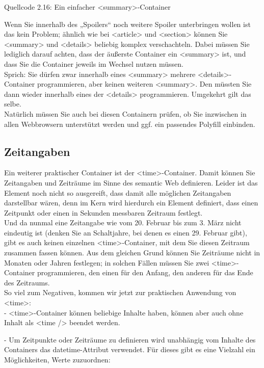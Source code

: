 Quellcode 2.16: Ein einfacher <summary>-Container

Wenn Sie innerhalb des „Spoilers“ noch weitere Spoiler unterbringen wollen ist das kein Problem; ähnlich wie bei <article> und <section> können Sie <summary> und <details> beliebig komplex verschachteln. Dabei müssen Sie lediglich darauf achten, dass der äußerste Container ein <summary> ist, und dass Sie die Container jeweils im Wechsel nutzen müssen.\\

Sprich: Sie dürfen zwar innerhalb eines <summary> mehrere <details>-Container programmieren, aber keinen weiteren <summary>. Den müssten Sie dann wieder innerhalb eines der <details> programmieren. Umgekehrt gilt das selbe.\\

Natürlich müssen Sie auch bei diesen Containern prüfen, ob Sie inzwischen in allen Webbrowsern unterstützt werden und ggf. ein passendes Polyfill einbinden.

\subsection{Zeitangaben}

Ein weiterer praktischer Container ist der <time>-Container. Damit können Sie Zeitangaben und Zeiträume im Sinne des semantic Web definieren. Leider ist das Element noch nicht so ausgereift, dass damit alle möglichen Zeitangaben darstellbar wären, denn im Kern wird hierdurch ein Element definiert, dass einen Zeitpunkt oder einen in Sekunden messbaren Zeitraum festlegt.\\

Und da nunmal eine Zeitangabe wie vom 20. Februar bis zum 3. März nicht eindeutig ist (denken Sie an Schaltjahre, bei denen es einen 29. Februar gibt), gibt es auch keinen einzelnen <time>-Container, mit dem Sie diesen Zeitraum zusammen fassen können. Aus dem gleichen Grund können Sie Zeiträume nicht in Monaten oder Jahren festlegen; in solchen Fällen müssen Sie zwei <time>-Container programmieren, den einen für den Anfang, den anderen für das Ende des Zeitraums.\\

So viel zum Negativen, kommen wir jetzt zur praktischen Anwendung von <time>:\\

-	<time>-Container können beliebige Inhalte haben, können aber auch ohne Inhalt als <time /> beendet werden.

-	Um Zeitpunkte oder Zeiträume zu definieren wird unabhängig vom Inhalte des Containers das datetime-Attribut verwendet. Für dieses gibt es eine Vielzahl ein Möglichkeiten, Werte zuzuordnen:

